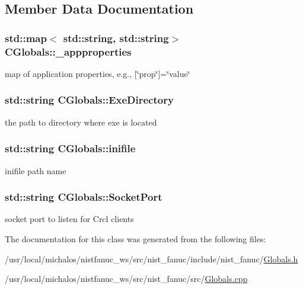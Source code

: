 \subsection{Member Data Documentation}
\hypertarget{classCGlobals_a66ffe804a7f6a8d41803482f5dc121e6}{
\subsubsection[{\-\_\-appproperties}]{\setlength{\rightskip}{0pt plus 5cm}std\-::map$<$ std\-::string, std\-::string$>$ C\-Globals\-::\-\_\-appproperties}}\label{classCGlobals_a66ffe804a7f6a8d41803482f5dc121e6}
map of application properties, e.\-g., \mbox{[}\char`\"{}prop\char`\"{}\mbox{]}=\char`\"{}value\char`\"{} \hypertarget{classCGlobals_a366c33d78a09a99d5eb0e902facf4624}{
\subsubsection[{Exe\-Directory}]{\setlength{\rightskip}{0pt plus 5cm}std\-::string C\-Globals\-::\-Exe\-Directory}}\label{classCGlobals_a366c33d78a09a99d5eb0e902facf4624}
the path to directory where exe is located \hypertarget{classCGlobals_a5ded9605f21a03f651f6097f1b0ef42c}{
\subsubsection[{inifile}]{\setlength{\rightskip}{0pt plus 5cm}std\-::string C\-Globals\-::inifile}}\label{classCGlobals_a5ded9605f21a03f651f6097f1b0ef42c}
inifile path name \hypertarget{classCGlobals_ac1198be99fab95dbe1f2b94891fb0088}{
\subsubsection[{Socket\-Port}]{\setlength{\rightskip}{0pt plus 5cm}std\-::string C\-Globals\-::\-Socket\-Port}}\label{classCGlobals_ac1198be99fab95dbe1f2b94891fb0088}
socket port to listen for Crcl clients 

The documentation for this class was generated from the following files\-:\begin{DoxyCompactItemize}
\item 
/usr/local/michalos/nistfanuc\-\_\-ws/src/nist\-\_\-fanuc/include/nist\-\_\-fanuc/\hyperlink{Globals_8h}{Globals.\-h}\item 
/usr/local/michalos/nistfanuc\-\_\-ws/src/nist\-\_\-fanuc/src/\hyperlink{Globals_8cpp}{Globals.\-cpp}\end{DoxyCompactItemize}
